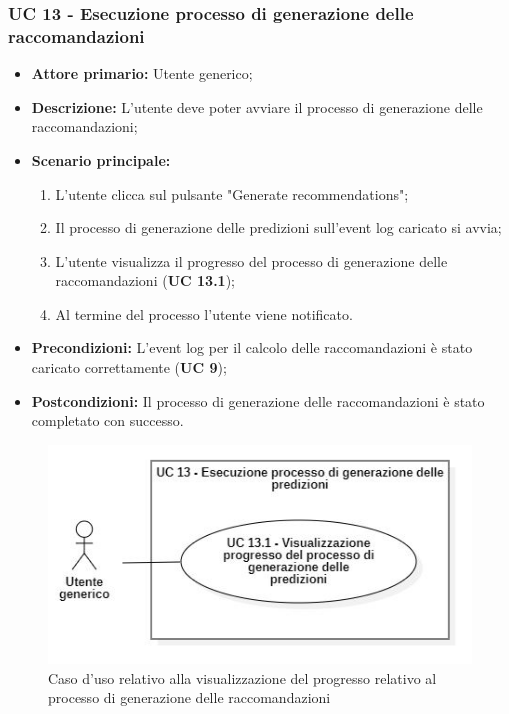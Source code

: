 \subsubsection{UC 13 - Esecuzione processo di generazione delle raccomandazioni}
\begin{itemize}
	\item \textbf{Attore primario:} Utente generico;
	\item \textbf{Descrizione:} L'utente deve poter avviare il processo di generazione delle raccomandazioni;
	\item \textbf{Scenario principale:} 
		\begin{enumerate}
			\item L'utente clicca sul pulsante "Generate recommendations";
			\item Il processo di generazione delle predizioni sull'event log caricato si avvia;
			\item L'utente visualizza il progresso del processo di generazione delle raccomandazioni (\textbf{UC 13.1});
			\item Al termine del processo l'utente viene notificato.
		\end{enumerate}
	\item \textbf{Precondizioni:} L'event log per il calcolo delle raccomandazioni è stato caricato correttamente (\textbf{UC 9});
	\item \textbf{Postcondizioni:} Il processo di generazione delle raccomandazioni è stato completato con successo. 
\end{itemize}

\begin{figure}[H]
    \centering
    \includegraphics[scale=0.6]{immagini/usecase/cd8.JPG}
    \caption{Caso d'uso relativo alla visualizzazione del progresso relativo al processo di generazione delle raccomandazioni}
\end{figure}

